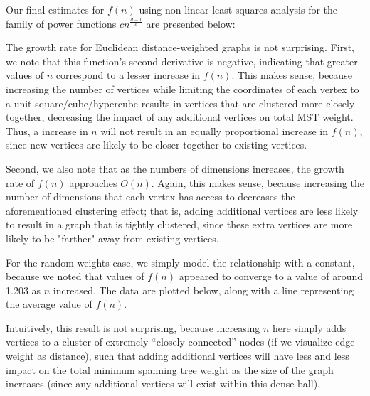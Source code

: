 \documentclass[a4paper]{article}
\begin{document}
Our final estimates for $f(n)$ using non-linear least squares analysis for the family of power functions $cn^{\frac{d-1}{d}}$ are presented below:


The growth rate for Euclidean distance-weighted graphs is not surprising. First, we note that this function's second derivative is negative, indicating that greater values of $n$ correspond to a lesser increase in $f(n)$. This makes sense, because increasing the number of vertices while limiting the coordinates of each vertex to a unit square/cube/hypercube results in vertices that are clustered more closely together, decreasing the impact of any additional vertices on total MST weight. Thus, a increase in $n$ will not result in an equally proportional increase in $f(n)$, since new vertices are likely to be closer together to existing vertices.

Second, we also note that as the numbers of dimensions increases, the growth rate of $f(n)$ approaches $O(n)$. Again, this makes sense, because increasing the number of dimensions that each vertex has access to decreases the aforementioned clustering effect; that is, adding additional vertices are less likely to result in a graph that is tightly clustered, since these extra vertices are more likely to be "farther" away from existing vertices.

For the random weights case, we simply model the relationship with a constant, because we noted that values of $f(n)$ appeared to converge to a value of around 1.203 as $n$ increased. The data are plotted below, along with a line representing the average value of $f(n)$.


Intuitively, this result is not surprising, because increasing $n$ here simply adds vertices to a cluster of extremely ``closely-connected'' nodes (if we visualize edge weight as distance), such that adding additional vertices will have less and less impact on the total minimum spanning tree weight as the size of the graph increases (since any additional vertices will exist within this dense ball).
\end{document}
